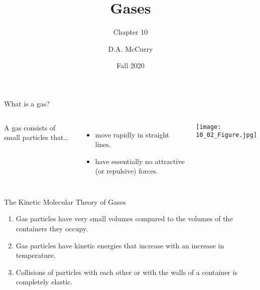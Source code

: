 \documentclass[notes=hide]{beamer}
\title{Gases}
\subtitle{Chapter 10}
\institute[CHEM115 Bloomsburg University]{CHEM115 --- Chemistry for the Sciences I \\ Bloomsburg University}
\author{D.A. McCurry}
\date{Fall 2020}
\begin{document}
\maketitle
{}


\begin{frame}{What is a gas?}
	\begin{columns}
		A gas consists of small particles that\ldots
		\begin{itemize}
			\item move rapidly in straight lines.
			\item have essentially no attractive (or repulsive) forces.
		\end{itemize}
		\begin{center}
			\texttt{[image: 10\_02\_Figure.jpg]}
		\end{center}
	\end{columns}

	\begin{block}{The Kinetic Molecular Theory of Gases}
		\begin{enumerate}
			\item Gas particles have very small volumes compared to
				the volumes of the containers they occupy.
			\item Gas particles have \alert{kinetic energies} that
				increase with an increase in temperature.
			\item Collisions of particles with each other or with
				the walls of a container is completely
				\alert{elastic}.
		\end{enumerate}
	\end{block}
\end{frame}

\end{document}
